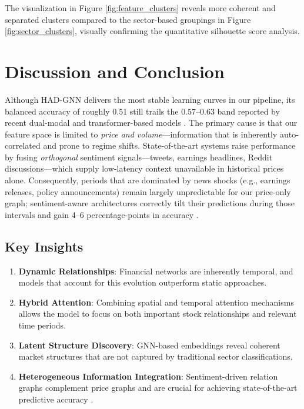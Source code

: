 \documentclass[12pt]{article}
\begin{document}
The visualization in Figure \ref{fig:feature_clusters} reveals more coherent and separated clusters compared to the sector-based groupings in Figure \ref{fig:sector_clusters}, visually confirming the quantitative silhouette score analysis.

\section{Discussion and Conclusion}

Although HAD-GNN delivers the most stable learning curves in our pipeline, its balanced accuracy of roughly 0.51 still trails the $0.57$–$0.63$ band reported by recent dual-modal and transformer-based models \cite{du2023,zhang2024,liu2025}.  
The primary cause is that our feature space is limited to \emph{price and volume}––information that is inherently auto-correlated and prone to regime shifts.  
State-of-the-art systems raise performance by fusing \textit{orthogonal} sentiment signals––tweets, earnings headlines, Reddit discussions––which supply low-latency context unavailable in historical prices alone.  
Consequently, periods that are dominated by news shocks (e.g., earnings releases, policy announcements) remain largely unpredictable for our price-only graph; sentiment-aware architectures correctly tilt their predictions during those intervals and gain 4–6 percentage-points in accuracy \cite{du2023}.

\subsection{Key Insights}

\begin{enumerate}
    \item \textbf{Dynamic Relationships}: Financial networks are inherently temporal, and models that account for this evolution outperform static approaches.
    \item \textbf{Hybrid Attention}: Combining spatial and temporal attention mechanisms allows the model to focus on both important stock relationships and relevant time periods.
    \item \textbf{Latent Structure Discovery}: GNN-based embeddings reveal coherent market structures that are not captured by traditional sector classifications.
    \item \textbf{Heterogeneous Information Integration}: Sentiment-driven relation graphs complement price graphs and are crucial for achieving state-of-the-art predictive accuracy \cite{zhang2024,liu2025}.
\end{enumerate}
\end{document}
